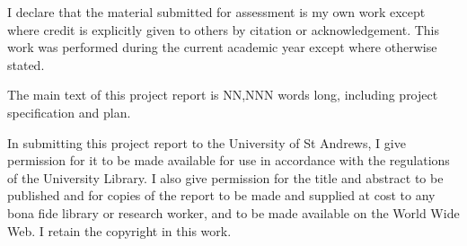 


I declare that the material submitted for assessment is my own work except where credit is explicitly given to others by citation or acknowledgement. This work was performed during the current academic year except where otherwise stated.

The main text of this project report is NN,NNN words long, including project specification and plan.

In submitting this project report to the University of St Andrews, I give permission for it to be made available for use in accordance with the regulations of the University Library. I also give permission for the title and abstract to be published and for copies of the report to be made and supplied at cost to any bona fide library or research worker, and to be made available on the World Wide Web. I retain the copyright in this work.


